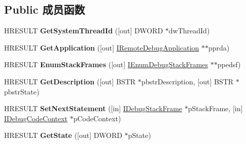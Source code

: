 \subsection*{Public 成员函数}
\begin{DoxyCompactItemize}
\item 
\mbox{\label{interface_i_remote_debug_application_thread_a38a671590d02e5a0bc125113cb6667a9}} 
H\+R\+E\+S\+U\+LT {\bfseries Get\+System\+Thread\+Id} (\mbox{[}out\mbox{]} D\+W\+O\+RD $\ast$dw\+Thread\+Id)
\item 
\mbox{\label{interface_i_remote_debug_application_thread_a4ada03a4e2c3e1d36f23b75a71ca574b}} 
H\+R\+E\+S\+U\+LT {\bfseries Get\+Application} (\mbox{[}out\mbox{]} \hyperlink{interface_i_remote_debug_application}{I\+Remote\+Debug\+Application} $\ast$$\ast$pprda)
\item 
\mbox{\label{interface_i_remote_debug_application_thread_a19dc9289f0f6df806110f2d4f8d149f3}} 
H\+R\+E\+S\+U\+LT {\bfseries Enum\+Stack\+Frames} (\mbox{[}out\mbox{]} \hyperlink{interface_i_enum_debug_stack_frames}{I\+Enum\+Debug\+Stack\+Frames} $\ast$$\ast$ppedsf)
\item 
\mbox{\label{interface_i_remote_debug_application_thread_a327df3262339fb8eab69e07400b23a44}} 
H\+R\+E\+S\+U\+LT {\bfseries Get\+Description} (\mbox{[}out\mbox{]} B\+S\+TR $\ast$pbstr\+Description, \mbox{[}out\mbox{]} B\+S\+TR $\ast$pbstr\+State)
\item 
\mbox{\label{interface_i_remote_debug_application_thread_a2563bfda72313b777c59e69c1efa962d}} 
H\+R\+E\+S\+U\+LT {\bfseries Set\+Next\+Statement} (\mbox{[}in\mbox{]} \hyperlink{interface_i_debug_stack_frame}{I\+Debug\+Stack\+Frame} $\ast$p\+Stack\+Frame, \mbox{[}in\mbox{]} \hyperlink{interface_i_debug_code_context}{I\+Debug\+Code\+Context} $\ast$p\+Code\+Context)
\item 
\mbox{\label{interface_i_remote_debug_application_thread_ab7d24c583d675840cbb7ba5153a1fb85}} 
H\+R\+E\+S\+U\+LT {\bfseries Get\+State} (\mbox{[}out\mbox{]} D\+W\+O\+RD $\ast$p\+State)

\end{DoxyCompactItemize}
